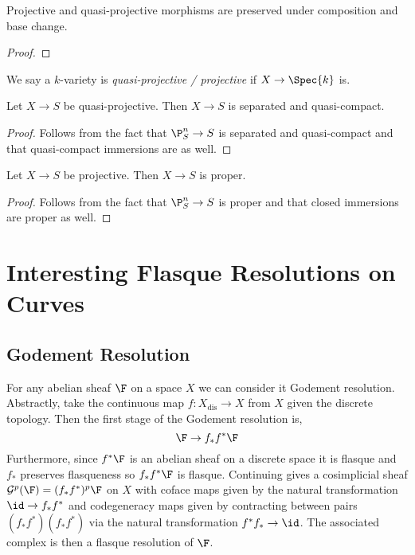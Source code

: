 \documentclass[12pt]{article}
\begin{document}
\begin{lemma}
Projective and quasi-projective morphisms are preserved under composition and base change.
\end{lemma}

\begin{proof}

\end{proof}

\begin{defn}
We say a $k$-variety is \textit{quasi-projective / projective} if $X \to \Spec{k}$ is.
\end{defn}

\begin{prop}
Let $X \to S$ be quasi-projective. Then $X \to S$ is separated and quasi-compact.
\end{prop}

\begin{proof}
Follows from the fact that $\P^n_S \to S$ is separated and quasi-compact and that quasi-compact immersions are as well.
\end{proof}

\begin{prop}
Let $X \to S$ be projective. Then $X \to S$ is proper.
\end{prop}

\begin{proof}
Follows from the fact that $\P^n_S \to S$ is proper and that closed immersions are proper as well.
\end{proof}

\section{Interesting Flasque Resolutions on Curves}

\subsection{Godement Resolution}

For any abelian sheaf $\F$ on a space $X$ we can consider it Godement resolution. Abstractly, take the continuous map $f : X_{\text{dis}} \to X$ from $X$ given the discrete topology. Then the first stage of the Godement resolution is,
\[ \F \to f_* f^* \F \]
Furthermore, since $f^* \F$ is an abelian sheaf on a discrete space it is flasque and $f_*$ preserves flasqueness so $f_* f^* \F$ is flasque.
Continuing gives a cosimplicial sheaf $\mathcal{G}^p(\F) = (f_* f^*)^p \F$ on $X$ with coface maps given by the natural transformation $\id \to f_* f^*$ and codegeneracy maps given by contracting between pairs $(f_* f^*)(f_* f^*)$ via the natural transformation $f^* f_* \to \id$.
The associated complex is then a flasque resolution of $\F$.
\end{document}
